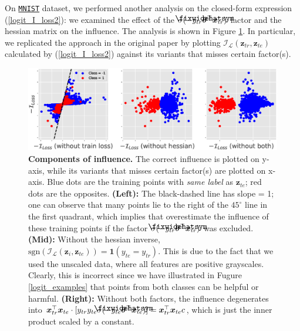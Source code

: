 \documentclass{article}
\newcommand\lowerwidehatsym{%
  \text{\smash{\raisebox{-1.3ex}{%
    $\fixwidehatsym$}}}}
\newcommand\fixwidehat[1]{%
  \mathchoice
    {\accentset{\displaystyle\lowerwidehatsym}{#1}}
    {\accentset{\textstyle\lowerwidehatsym}{#1}}
    {\accentset{\scriptstyle\lowerwidehatsym}{#1}}
    {\accentset{\scriptscriptstyle\lowerwidehatsym}{#1}}
}
\begin{document}
On \href{http://yann.lecun.com/exdb/mnist/}{\texttt{MNIST}} dataset, we performed another analysis on the closed-form expression (\ref{logit_I_loss2}): we examined the effect of the $\sigma(-y_{tr}\fixwidehat{\bm{\theta}}^{\top}\bm{x}_{tr})$ factor and the hessian matrix on the influence. The analysis is shown in Figure \ref{logit_components}. In particular, we replicated the approach in the original paper by plotting $\mathcal{I}_{\mathcal{L}}(\bm{z}_{tr}, \bm{z}_{te})$ calculated by (\ref{logit_I_loss2}) against its variants that misses certain factor(s). 

\begin{figure}[ht]
\vskip 0.0in
\begin{center}
\centerline{\includegraphics[width=\columnwidth]{fig-components}}
\vskip -0.1in
\caption{\textbf{Components of influence.} The correct influence is plotted on y-axis, while its variants that misses certain factor(s) are plotted on x-axis. Blue dots are the training points with \emph{same label} as $\bm{z}_{te}$; red dots are the opposites. \textbf{(Left):} The black-dashed line has slope = 1; one can observe that many points lie to the right of the $45^{\circ}$ line in the first quadrant, which implies that overestimate the influence of these training points if the factor $\sigma(-y_{tr}\fixwidehat{\bm{\theta}}^{\top}\bm{x}_{tr})$ was excluded. \textbf{(Mid):} Without the hessian inverse, $\text{sgn}(\mathcal{I}_{\mathcal{L}}(\bm{z}_{i}, \bm{z}_{te})) = \bm{1} (y_{te}=y_{tr})$. This is due to the fact that we used the unscaled data, where all features are positive grayscales. Clearly, this is incorrect since we have illustrated in Fugure \ref{logit_examples} that points from both classes can be helpful or harmful. \textbf{(Right):} Without both factors, the influence degenerates into $\bm{x}_{tr}^{\top} \bm{x}_{te}\cdot [y_{tr}y_{te}\sigma(-y_{te}\fixwidehat{\bm{\theta}}^{\top}\bm{x}_{te})] = \bm{x}_{tr}^{\top} \bm{x}_{te}c$, which is just the inner product scaled by a constant. } 
\label{logit_components}
\end{center}
\vskip -0.25in
\end{figure}
\end{document}

